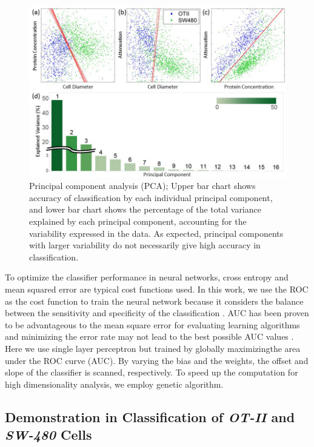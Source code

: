 \documentclass[aps,pra,reprint,superscriptaddress]{revtex4-1}
\begin{document}
\begin{figure}
\includegraphics[scale=0.55]{FigurePCA.jpg}
\caption{\label{fig:PCA} Principal component analysis (PCA); Upper bar chart shows accuracy of classification by each individual principal component, and lower bar chart shows the percentage of the total variance explained by each principal component, accounting for the variability expressed in the data. As expected, principal components with larger variability do not necessarily give high accuracy in classification.}
\end{figure}

To optimize the classifier performance in neural networks, cross entropy and mean squared error are typical cost functions used. In this work, we use the ROC as the cost function to train the neural network because it considers the balance between the sensitivity and specificity of the classification \cite{hanley1982meaning}. AUC has been proven to be advantageous to the mean square error for evaluating learning algorithms \cite{verrelst1998use} and minimizing the error rate may not lead to the best possible AUC values \cite{cortes2004auc,huang2005using}. Here we use single layer perceptron but trained by globally maximizingthe area under the ROC curve (AUC). By varying the bias and the weights, the offset and slope of the classifier is scanned, respectively. To speed up the computation for high dimensionality analysis, we employ genetic algorithm. 

\subsection{Demonstration in Classification of \textit{OT-II} and \textit{SW-480} Cells}
\end{document}
